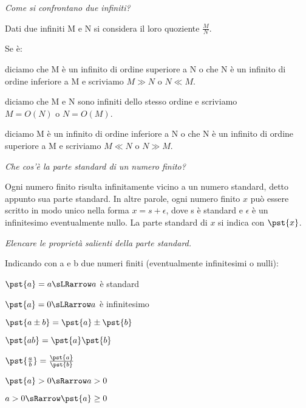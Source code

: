 \begin{esercizio}\label{ese:iper_025} 
\emph{Come si confrontano due infiniti?}

Dati due infiniti M e N si considera il loro quoziente \(\frac{M}{N}\). 

Se è:
\begin{description} [nosep]
 \item [infinito] 
diciamo che M è un infinito di ordine superiore a N o che N è un infinito 
di ordine inferiore a M e scriviamo \(M \gg N\) o \(N \ll M\).
 \item [finito non infinitesimo] 
diciamo che M e N sono infiniti dello stesso ordine e scriviamo \\
\(M = O(N)\) o \(N = O(M)\).
 \item [infinitesimo]
diciamo M è un infinito di ordine inferiore a N o che N è un 
infinito di ordine superiore a M e scriviamo \(M \ll N\) o \(N \gg M\).
\end{description}
\end{esercizio}

\begin{esercizio}\label{ese:iper_026} 
\emph{Che cos'è la parte standard di un numero finito?}

Ogni numero finito risulta infinitamente vicino a un numero standard, detto 
appunto sua parte standard. 
In altre parole, ogni numero finito \(x\) può 
essere scritto in modo unico nella forma \(x = s + \epsilon\), dove s è 
standard e \(\epsilon\) è un infinitesimo eventualmente nullo. La parte 
standard di \(x\) si indica con \(\pst{x}\).
\end{esercizio}


\begin{esercizio}\label{ese:iper_027} 
\emph{Elencare le proprietà salienti della parte standard.}

Indicando con a e b due numeri finiti (eventualmente infinitesimi o nulli):
\vspace{-.5em}
\begin{multicols}{2}
\(\pst{a} = a \sLRarrow a\) è standard

\(\pst{a} = 0 \sLRarrow a\) è infinitesimo

\(\pst{a \pm b} = \pst{a} \pm \pst{b}\)

\(\pst{ab} = \pst{a} \pst{b}\)

\(\pst{\frac{a}{b}} = \frac{\pst{a}}{\pst{b}}\)

\(\pst{a} > 0 \sRarrow a > 0\)

\(a > 0 \sRarrow \pst{a} \geq 0\)
\end{multicols}

\end{esercizio}

